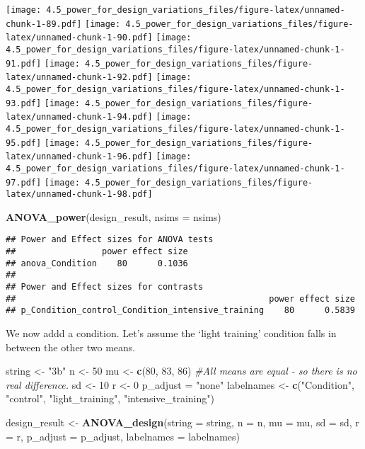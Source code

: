 \documentclass[]{article}
\newenvironment{Shaded}{\begin{snugshade}}{\end{snugshade}}
\newcommand{\KeywordTok}[1]{\textcolor[rgb]{0.13,0.29,0.53}{\textbf{#1}}}
\newcommand{\DataTypeTok}[1]{\textcolor[rgb]{0.13,0.29,0.53}{#1}}
\newcommand{\DecValTok}[1]{\textcolor[rgb]{0.00,0.00,0.81}{#1}}
\newcommand{\StringTok}[1]{\textcolor[rgb]{0.31,0.60,0.02}{#1}}
\newcommand{\CommentTok}[1]{\textcolor[rgb]{0.56,0.35,0.01}{\textit{#1}}}
\newcommand{\NormalTok}[1]{#1}
\begin{document}
\texttt{[image: 4.5\_power\_for\_design\_variations\_files/figure-latex/unnamed-chunk-1-89.pdf]}
\texttt{[image: 4.5\_power\_for\_design\_variations\_files/figure-latex/unnamed-chunk-1-90.pdf]}
\texttt{[image: 4.5\_power\_for\_design\_variations\_files/figure-latex/unnamed-chunk-1-91.pdf]}
\texttt{[image: 4.5\_power\_for\_design\_variations\_files/figure-latex/unnamed-chunk-1-92.pdf]}
\texttt{[image: 4.5\_power\_for\_design\_variations\_files/figure-latex/unnamed-chunk-1-93.pdf]}
\texttt{[image: 4.5\_power\_for\_design\_variations\_files/figure-latex/unnamed-chunk-1-94.pdf]}
\texttt{[image: 4.5\_power\_for\_design\_variations\_files/figure-latex/unnamed-chunk-1-95.pdf]}
\texttt{[image: 4.5\_power\_for\_design\_variations\_files/figure-latex/unnamed-chunk-1-96.pdf]}
\texttt{[image: 4.5\_power\_for\_design\_variations\_files/figure-latex/unnamed-chunk-1-97.pdf]}
\texttt{[image: 4.5\_power\_for\_design\_variations\_files/figure-latex/unnamed-chunk-1-98.pdf]}

\begin{Shaded}
\begin{Highlighting}[]
\KeywordTok{ANOVA_power}\NormalTok{(design_result, }\DataTypeTok{nsims =}\NormalTok{ nsims)}
\end{Highlighting}
\end{Shaded}

\begin{verbatim}
## Power and Effect sizes for ANOVA tests
##                 power effect size
## anova_Condition    80      0.1036
## 
## Power and Effect sizes for contrasts
##                                                  power effect size
## p_Condition_control_Condition_intensive_training    80      0.5839
\end{verbatim}

We now addd a condition. Let's assume the `light training' condition
falls in between the other two means.

\begin{Shaded}
\begin{Highlighting}[]
\NormalTok{string <-}\StringTok{ "3b"}
\NormalTok{n <-}\StringTok{ }\DecValTok{50}
\NormalTok{mu <-}\StringTok{ }\KeywordTok{c}\NormalTok{(}\DecValTok{80}\NormalTok{, }\DecValTok{83}\NormalTok{, }\DecValTok{86}\NormalTok{) }\CommentTok{#All means are equal - so there is no real difference.}
\NormalTok{sd <-}\StringTok{ }\DecValTok{10}
\NormalTok{r <-}\StringTok{ }\DecValTok{0} 
\NormalTok{p_adjust =}\StringTok{ "none"}
\NormalTok{labelnames <-}\StringTok{ }\KeywordTok{c}\NormalTok{(}\StringTok{"Condition"}\NormalTok{, }\StringTok{"control"}\NormalTok{, }\StringTok{"light_training"}\NormalTok{, }\StringTok{"intensive_training"}\NormalTok{) }

\NormalTok{design_result <-}\StringTok{ }\KeywordTok{ANOVA_design}\NormalTok{(}\DataTypeTok{string =}\NormalTok{ string,}
                   \DataTypeTok{n =}\NormalTok{ n, }
                   \DataTypeTok{mu =}\NormalTok{ mu, }
                   \DataTypeTok{sd =}\NormalTok{ sd, }
                   \DataTypeTok{r =}\NormalTok{ r, }
                   \DataTypeTok{p_adjust =}\NormalTok{ p_adjust,}
                   \DataTypeTok{labelnames =}\NormalTok{ labelnames)}
\end{Highlighting}
\end{Shaded}
\end{document}
